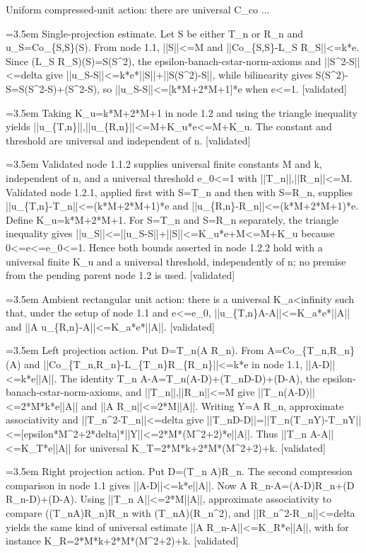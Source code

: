 \documentclass{article}
\newcommand{\step}[1]{\par\noindent\hangindent=3.5em\hangafter=1%
  \makebox[3.5em][l]{\textbf{#1.}}}
\newcommand{\steptag}[1]{\hfill{\small\textsf{[#1]}}}
\begin{document}
\begin{proofbox}{Uniform compressed-unit action: there are universal C\_co ...}
\step{1.2.1} Single-projection estimate. Let S be either T\_n or R\_n and u\_S=Co\_\{S,S\}(S). From node 1.1, ||S||<=M and ||Co\_\{S,S\}-L\_S R\_S||<=k*e. Since (L\_S R\_S)(S)=S(S\textasciicircum{}2), the epsilon-banach-cstar-norm-axioms and ||S\textasciicircum{}2-S||<=delta give ||u\_S-S||<=k*e*||S||+||S(S\textasciicircum{}2)-S||, while bilinearity gives S(S\textasciicircum{}2)-S=S(S\textasciicircum{}2-S)+(S\textasciicircum{}2-S), so ||u\_S-S||<=[k*M+2*M+1]*e when e<=1. \steptag{validated} \\[4pt]
\step{1.2.2} Taking K\_u=k*M+2*M+1 in node 1.2 and using the triangle inequality yields ||u\_\{T,n\}||,||u\_\{R,n\}||<=M+K\_u*e<=M+K\_u. The constant and threshold are universal and independent of n. \steptag{validated} \\[6pt]
\step{1.2.2.1} Validated node 1.1.2 supplies universal finite constants M and k, independent of n, and a universal threshold e\_0<=1 with ||T\_n||,||R\_n||<=M. Validated node 1.2.1, applied first with S=T\_n and then with S=R\_n, supplies ||u\_\{T,n\}-T\_n||<=(k*M+2*M+1)*e and ||u\_\{R,n\}-R\_n||<=(k*M+2*M+1)*e. Define K\_u=k*M+2*M+1. For S=T\_n and S=R\_n separately, the triangle inequality gives ||u\_S||<=||u\_S-S||+||S||<=K\_u*e+M<=M+K\_u because 0<=e<=e\_0<=1. Hence both bounds asserted in node 1.2.2 hold with a universal finite K\_u and a universal threshold, independently of n; no premise from the pending parent node 1.2 is used. \steptag{validated} \\[4pt]
\step{1.3} Ambient rectangular unit action: there is a universal K\_a<infinity such that, under the setup of node 1.1 and e<=e\_0, ||u\_\{T,n\}A-A||<=K\_a*e*||A|| and ||A u\_\{R,n\}-A||<=K\_a*e*||A||. \steptag{validated} \\[6pt]
\step{1.3.1} Left projection action. Put D=T\_n(A R\_n). From A=Co\_\{T\_n,R\_n\}(A) and ||Co\_\{T\_n,R\_n\}-L\_\{T\_n\}R\_\{R\_n\}||<=k*e in node 1.1, ||A-D||<=k*e||A||. The identity T\_n A-A=T\_n(A-D)+(T\_nD-D)+(D-A), the epsilon-banach-cstar-norm-axioms, and ||T\_n||,||R\_n||<=M give ||T\_n(A-D)||<=2*M*k*e||A|| and ||A R\_n||<=2*M||A||. Writing Y=A R\_n, approximate associativity and ||T\_n\textasciicircum{}2-T\_n||<=delta give ||T\_nD-D||=||T\_n(T\_nY)-T\_nY||<=[epsilon*M\textasciicircum{}2+2*delta]*||Y||<=2*M*(M\textasciicircum{}2+2)*e||A||. Thus ||T\_n A-A||<=K\_T*e||A|| for universal K\_T=2*M*k+2*M*(M\textasciicircum{}2+2)+k. \steptag{validated} \\[4pt]
\step{1.3.2} Right projection action. Put D=(T\_n A)R\_n. The second compression comparison in node 1.1 gives ||A-D||<=k*e||A||. Now A R\_n-A=(A-D)R\_n+(D R\_n-D)+(D-A). Using ||T\_n A||<=2*M||A||, approximate associativity to compare ((T\_nA)R\_n)R\_n with (T\_nA)(R\_n\textasciicircum{}2), and ||R\_n\textasciicircum{}2-R\_n||<=delta yields the same kind of universal estimate ||A R\_n-A||<=K\_R*e||A||, with for instance K\_R=2*M*k+2*M*(M\textasciicircum{}2+2)+k. \steptag{validated} \\[4pt]

\end{proofbox}
\end{document}
